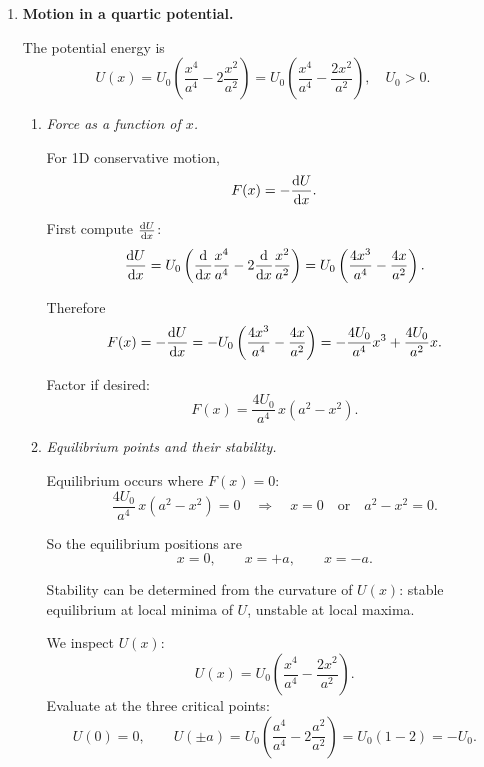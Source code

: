\documentclass[12pt]{article}
\begin{document}
\begin{enumerate}
\begin{enumerate}
    So
    \[
    T_\text{rot}
    = \frac{1}{2}
    \frac{m^2 v_0^2}{\left( \frac{1}{2} M + m \right)}.
    \]

    As expected for a perfectly inelastic capture, mechanical energy is not conserved: the final kinetic energy is less than the initial kinetic energy $\tfrac{1}{2} m v_0^2$, with the difference converted into internal energy/heat/deformation.
\end{enumerate}


\item \textbf{Motion in a quartic potential.}

The potential energy is
\[
U(x) = U_0 \left( \frac{x^4}{a^4} - 2 \frac{x^2}{a^2} \right)
= U_0 \left( \frac{x^4}{a^4} - \frac{2x^2}{a^2} \right)
,
\quad U_0>0.
\]

\begin{enumerate}
    \item \textit{Force as a function of $x$.}

    For 1D conservative motion,
    \[
    F(x) = - \dv{U}{x}.
    \]

    First compute $\dv{U}{x}$:
    \[
    \dv{U}{x}
    = U_0 \left(
    \dv{x} \frac{x^4}{a^4}
    - 2 \dv{x} \frac{x^2}{a^2}
    \right)
    = U_0 \left(
    \frac{4x^3}{a^4}
    - \frac{4x}{a^2}
    \right).
    \]

    Therefore
    \[
    F(x) = -\dv{U}{x}
    = - U_0 \left(
    \frac{4x^3}{a^4}
    - \frac{4x}{a^2}
    \right)
    = - \frac{4U_0}{a^4} x^3 + \frac{4U_0}{a^2} x.
    \]

    Factor if desired:
    \[
    F(x) = \frac{4U_0}{a^4} \, x \left( a^2 - x^2 \right).
    \]

    \item \textit{Equilibrium points and their stability.}

    Equilibrium occurs where $F(x)=0$:
    \[
    \frac{4U_0}{a^4} \, x \left( a^2 - x^2 \right) = 0
    \quad\Longrightarrow\quad
    x=0 \quad \text{or} \quad a^2-x^2 = 0.
    \]

    So the equilibrium positions are
    \[
    x = 0, \qquad x = +a, \qquad x = -a.
    \]

    Stability can be determined from the curvature of $U(x)$: stable equilibrium at local minima of $U$, unstable at local maxima.

    We inspect $U(x)$:
    \[
    U(x) = U_0 \left(\frac{x^4}{a^4} - \frac{2x^2}{a^2}\right).
    \]
    Evaluate at the three critical points:
    \[
    U(0) = 0,
    \qquad
    U(\pm a) = U_0 \left( \frac{a^4}{a^4} - 2\frac{a^2}{a^2} \right)
    = U_0 (1 - 2)
    = -U_0.
    \]


\end{enumerate}
\end{enumerate}
\end{document}
